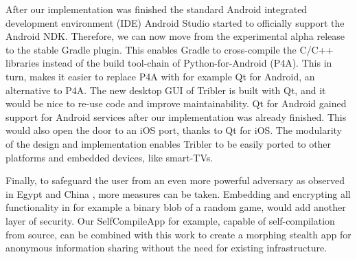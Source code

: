 
After our implementation was finished the standard Android integrated development environment (IDE) Android Studio started to officially support the Android NDK.
Therefore, we can now move from the experimental alpha release to the stable Gradle plugin.
This enables Gradle to cross-compile the C/C++ libraries instead of the build tool-chain of Python-for-Android (P4A).
This in turn, makes it easier to replace P4A with for example Qt for Android, an alternative to P4A.
The new desktop GUI of Tribler is built with Qt, and it would be nice to re-use code and improve maintainability.
Qt for Android gained support for Android services after our implementation was already finished.
This would also open the door to an iOS port, thanks to Qt for iOS.
The modularity of the design and implementation enables Tribler to be easily ported to other platforms and embedded devices, like smart-TVs.

Finally, to safeguard the user from an even more powerful adversary as observed in Egypt \cite{egypt_show_your_facebook_airport} and China \cite{nyt2015china}, more measures can be taken.
Embedding and encrypting all functionality in for example a binary blob of a random game, would add another layer of security.
Our SelfCompileApp \cite{brussee2015autonomous} for example, capable of self-compilation from source, can be combined with this work to create a morphing stealth app for anonymous information sharing without the need for existing infrastructure.

